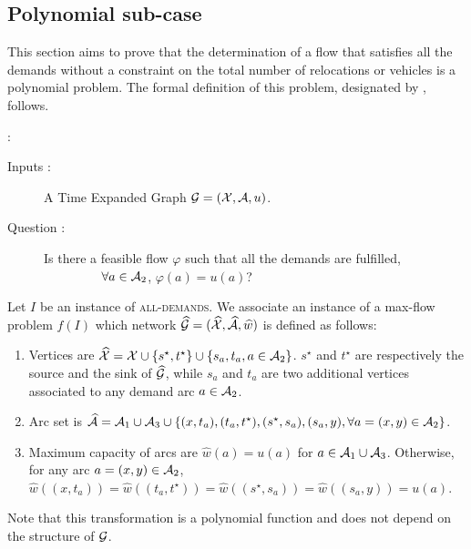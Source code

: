\begin{bibunit}[ieeetr]
\subsection{Polynomial sub-case}
This section aims to prove that the determination of a flow that satisfies all the demands 
without a constraint on the total number of relocations or vehicles is a polynomial problem.
The formal definition of this problem, designated by {\SDPALLDEMANDS}, follows.

\bigskip
\noindent{\SDPALLDEMANDS}:
\begin{description}
\item[Inputs :] A Time Expanded Graph $\mathcal{G} = (\mathcal{X}, \mathcal{A}, u)$.
\item[Question :]
Is there a feasible flow $\varphi$ such that all the demands are fulfilled,\\
~~~~~~~~~\ie $\forall a \in \mathcal{A}_2$, $\varphi(a)=u(a)$?
\end{description}

Let $I$ be an instance of \textsc{all-demands}.
We associate an instance of a max-flow problem $f(I)$ which network $\widehat{\mathcal{G}}=(\widehat{\mathcal{X}}, \widehat{\mathcal{A}}, \widehat{w})$ is defined as follows:
\begin{enumerate}
\item
Vertices are $\widehat{\mathcal{X}} = \mathcal{X} \cup \{s^\star, t^\star\} \cup \{s_a, t_a, a \in \mathcal{A}_2\}$.
$s^\star$ and $t^\star$ are respectively the source and the sink of $\widehat{\mathcal{G}}$, while $s_a$ and $t_a$ are two additional vertices associated to any demand arc $a \in \mathcal{A}_2$.
\item
Arc set is $\widehat{\mathcal{A}} = \mathcal{A}_1 \cup \mathcal{A}_3 \cup \{ (x,t_a), (t_a,t^\star), (s^\star, s_a), (s_a,y), \forall a=(x,y)\in \mathcal{A}_2\}$.
\item
Maximum capacity of arcs are $\widehat{w}(a) = u(a)$ for $a \in \mathcal{A}_1 \cup \mathcal{A}_3$.
Otherwise, for any arc $a=(x,y) \in \mathcal{A}_2$, $\widehat{w}((x,t_a))=\widehat{w}((t_a,t^\star))=\widehat{w}((s^\star, s_a))=\widehat{w}( (s_a,y))=u(a)$.
\end{enumerate}
Note that this transformation is a polynomial function and does not depend on the structure of $\mathcal{G}$.


\end{bibunit}
